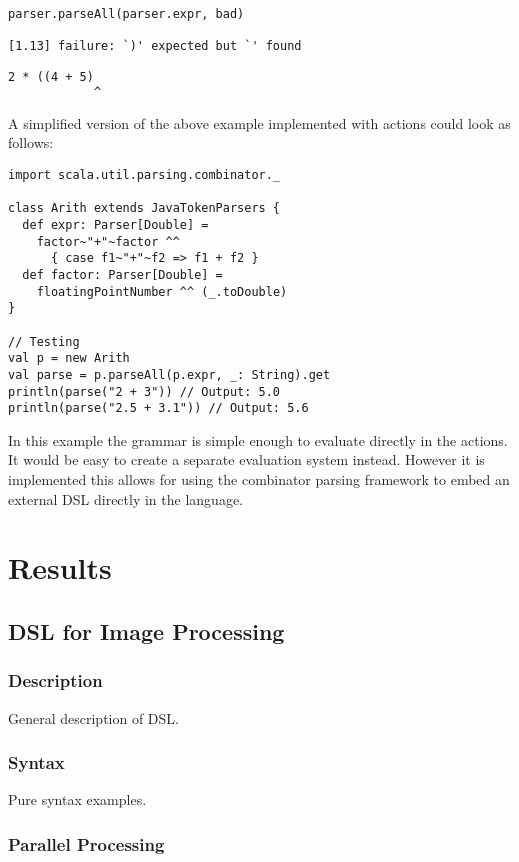 \documentclass[a4paper,english]{report}
\begin{document}
\begin{lstlisting}[language=tex]
parser.parseAll(parser.expr, bad)

[1.13] failure: `)' expected but `' found

2 * ((4 + 5)
            ^
\end{lstlisting}

A simplified version of the above example implemented with actions
could look as follows:

\begin{lstlisting}
import scala.util.parsing.combinator._

class Arith extends JavaTokenParsers {
  def expr: Parser[Double] =
    factor~"+"~factor ^^ 
      { case f1~"+"~f2 => f1 + f2 }
  def factor: Parser[Double] =
    floatingPointNumber ^^ (_.toDouble)
}

// Testing
val p = new Arith
val parse = p.parseAll(p.expr, _: String).get
println(parse("2 + 3")) // Output: 5.0
println(parse("2.5 + 3.1")) // Output: 5.6
\end{lstlisting}

In this example the grammar is simple enough to evaluate directly in
the actions. It would be easy to create a separate evaluation system
instead. However it is implemented this allows for using the
combinator parsing framework to embed an external DSL directly in the
language.

\chapter{Results}

\section{DSL for Image Processing}

\subsection{Description}

General description of DSL.

\subsection{Syntax}

Pure syntax examples.

\subsection{Parallel Processing}
\end{document}
